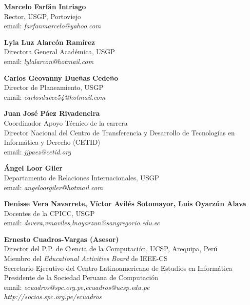 \begin{center}
\textbf{Marcelo Farfán Intriago}\\
Rector, USGP, Portoviejo\\
email: \textit{farfanmarcelo@yahoo.com}\\
\end{center}

\begin{center}
\textbf{Lyla Luz Alarcón Ramírez}\\
Directora General Académica, USGP\\
email: \textit{lylalarcon@hotmail.com}
\end{center}

\begin{center}
\textbf{Carlos Geovanny Dueñas Cedeño}\\
Director de Planeamiento, USGP\\
email: \textit{carlosduece54@hotmail.com}
\end{center}

\begin{center}
\textbf{Juan José Páez Rivadeneira}\\
Coordinador Apoyo Técnico de la carrera\\
Director Nacional del Centro de Transferencia y Desarrollo de Tecnologías en Informática y Derecho (CETID)\\
email: \textit{jjpaez@cetid.org}
\end{center}

\begin{center}
\textbf{Ángel Loor Giler}\\
Departamento de Relaciones Internacionales, USGP\\
email: \textit{angeloorgiler@hotmail.com}
\end{center}

\begin{center}
\textbf{Denisse Vera Navarrete, Víctor Avilés Sotomayor, Luis Oyarzún Alava}\\
Docentes de la CPICC, USGP\\
email: \textit{{dsvera,vmaviles,lnoyarzun}@sangregorio.edu.ec}
\end{center}

\begin{center}
\textbf{Ernesto Cuadros-Vargas (Asesor)}\\
Director del P.P. de Ciencia de la Computación, UCSP, Arequipa, Perú\\
Miembro del \textit{Educational Activities Board} de IEEE-CS\\
Secretario Ejecutivo del Centro Latinoamericano de Estudios en Informática\\
Presidente de la Sociedad Peruana de Computación\\
email: \textit{ecuadros@spc.org.pe,ecuadros@ucsp.edu.pe}\\
\textit{http://socios.spc.org.pe/ecuadros}
\end{center}

